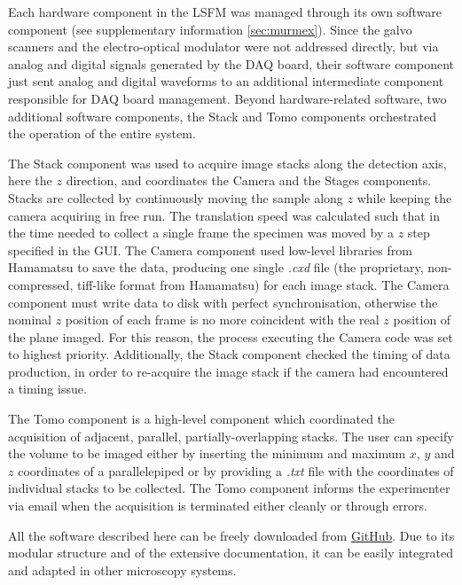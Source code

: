 \documentclass[12pt]{spieman}  %
\begin{document}
\begin{spacing}{2}
Each hardware component in the LSFM was managed through its own software component (see supplementary information \ref{sec:murmex}). Since the galvo scanners and the electro-optical modulator were not addressed directly, but via analog and digital signals generated by the DAQ board, their software component just sent analog and digital waveforms to an additional intermediate component responsible for DAQ board management. Beyond hardware-related software, two additional software components, the Stack and Tomo components orchestrated the operation of the entire system. 

The Stack component was used to acquire image stacks along the detection axis, here the $z$ direction, and coordinates the Camera and the Stages components. Stacks are collected by continuously moving the sample along $z$ while keeping the camera acquiring in free run. The translation speed was calculated such that in the time needed to collect a single frame the specimen was moved by a $z$ step specified in the GUI. The Camera component used low-level libraries from Hamamatsu to save the data, producing one single \emph{.cxd} file (the proprietary, non-compressed, tiff-like format from Hamamatsu) for each image stack. The Camera component must write data to disk with perfect synchronisation, otherwise the nominal $z$ position of each frame is no more coincident with the real $z$ position of the plane imaged. For this reason, the process executing the Camera code was set to highest priority. Additionally, the Stack component checked the timing of data production, in order to re-acquire the image stack if the camera had encountered a timing issue. 

The Tomo component is a high-level component which coordinated the acquisition of adjacent, parallel, partially-overlapping stacks. The user can specify the volume to be imaged either by inserting the minimum and maximum $x$, $y$ and $z$ coordinates of a parallelepiped or by providing a \textit{.txt} file with the coordinates of individual stacks to be collected. The Tomo component informs the experimenter via email when the acquisition is terminated either cleanly or through errors.

All the software described here can be freely downloaded from \href{https://github.com/marcelvanthoff/Giorgio}{GitHub}. Due to its modular structure and of the extensive documentation, it can be easily integrated and adapted in other microscopy systems.


\end{spacing}
\end{document}
